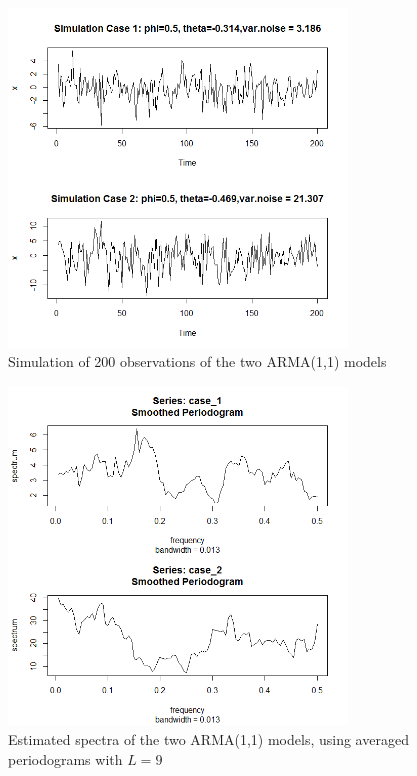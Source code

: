 \begin{figure}
	\centering
	\includegraphics[width=9cm]{Figures/Problem5_2}
	\caption{Simulation of 200 observations of the two ARMA(1,1) models}
	\label{fig:Simulation}
\end{figure}

\begin{figure}
	\centering
	\includegraphics[width=9cm]{Figures/Problem5_3}
	\caption{Estimated spectra of the two ARMA(1,1) models, using averaged periodograms with $L=9$}
	\label{fig:EstimateSpectra}
\end{figure}
